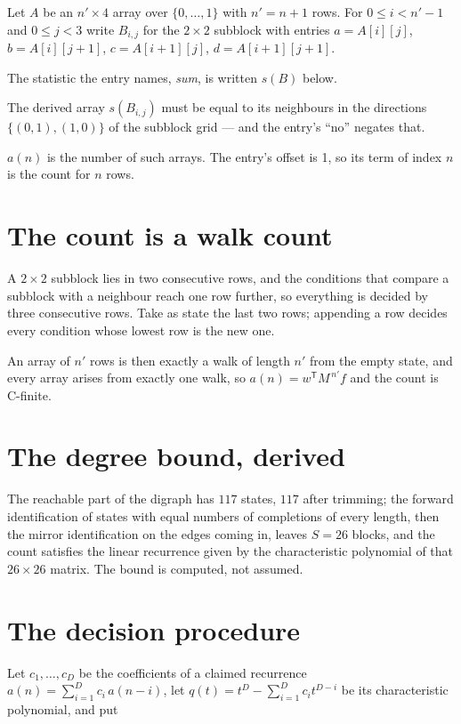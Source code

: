\documentclass[11pt]{article}
\theoremstyle{definition}
\begin{document}
Let $A$ be an $n' \times 4$ array over $\{0,\dots,1\}$ with $n' = n + 1$ rows. For $0 \le i < n'-1$ and $0 \le j < 3$ write $B_{i,j}$ for the $2\times2$ subblock with entries $a = A[i][j]$, $b = A[i][j{+}1]$, $c = A[i{+}1][j]$, $d = A[i{+}1][j{+}1]$.

The statistic the entry names, {\itshape sum}, is written $s(B)$ below.

The derived array $s(B_{i,j})$ must be equal to its neighbours in the directions $\{(0,1), (1,0)\}$ of the subblock grid --- and the entry's ``no'' negates that.

$a(n)$ is the number of such arrays. The entry's offset is 1, so its term of index $n$ is the count for $n$ rows.

\section{The count is a walk count}

A $2\times2$ subblock lies in two consecutive rows, and the conditions that compare a subblock with a neighbour reach one row further, so everything is decided by three consecutive rows. Take as state the last two rows; appending a row decides every condition whose lowest row is the new one.

An array of $n'$ rows is then exactly a walk of length $n'$ from the empty state, and every array arises from exactly one walk, so $a(n) = w^{\mathsf T}M^{\,n'}f$ and the count is C-finite.

\section{The degree bound, derived}

The reachable part of the digraph has $117$ states, $117$ after trimming; the forward identification of states with equal numbers of completions of every length, then the mirror identification on the edges coming in, leaves $S = 26$ blocks, and the count satisfies the linear recurrence given by the characteristic polynomial of that $26\times26$ matrix. The bound is computed, not assumed.

\section{The decision procedure}

Let $c_1,\dots,c_D$ be the coefficients of a claimed recurrence $a(n) = \sum_{i=1}^{D} c_i\,a(n-i)$, let $q(t) = t^{D} - \sum_{i=1}^{D} c_i t^{D-i}$ be its characteristic polynomial, and put
\end{document}
